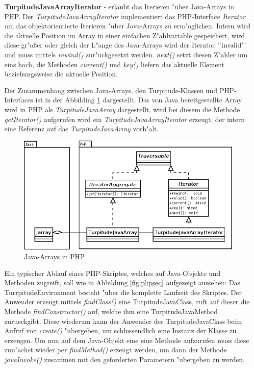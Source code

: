 \textbf{TurpitudeJavaArrayIterator} - erlaubt das Iterieren "uber Java-Arrays in PHP. Der \emph{TurpitudeJavaArrayIterator} implementiert
das PHP-Interface \emph{Iterator} um das objektorientierte Iterieren "uber Java-Arrays zu erm"oglichen. Intern wird die aktuelle
Position im Array in einer einfachen Z"ahlvariable gespeichert, wird diese gr"o\ss er oder gleich der L"ange des Java-Arrays wird der
Iterator "'invalid"' und muss mittels \emph{rewind()} zur"uckgesetzt werden. \emph{next()} setzt diesen Z"ahler um eins hoch, die Methoden
\emph{current()} und \emph{key()} liefern das aktuelle Element beziehungsweise die aktuelle Position.

Der Zusammenhang zwischen Java-Arrays, den Turpitude-Klassen und PHP-Interfaces ist in der Abbilding \ref{fig:javaarrays} dargestellt.
Das von Java bereitgestellte Array wird in PHP als \emph{TurpitudeJavaArray} dargestellt, wird bei diesem die Methode
\emph{getIterator()} aufgerufen wird ein \emph{TurpitudeJavaArrayIterator} erzeugt, der intern eine Referenz auf das \emph{TurpitudeJavaArray}
vorh"alt. 

\begin{figure}[h]
\includegraphics[width=\textwidth]{chap1/img/javaarrays.png}
\caption{Java-Arrays in PHP}
\label{fig:javaarrays}
\end{figure}

Ein typischer Ablauf eines PHP-Skriptes, welches auf Java-Objekte und Methoden zugreift, soll wie in Abbildung \ref{fig:phpseq} aufgezeigt 
aussehen:
Das TurrpitudeEnvironment besteht "uber die komplette Laufzeit des Skriptes. Der Anwender erzeugt mittels \emph{findClass()} eine
TurpitudeJavaClass, ruft auf dieser die Methode \emph{findConstructor()} auf, welche ihm eine TurpitudeJavaMethod zurueckgibt. Diese wiederum 
kann der Anwender der TurpitudeJavaClass beim Aufruf von \emph{create()} "ubergeben, um schlussendlich eine Instanz der Klasse zu erzeugen.
Um nun auf dem Java-Objekt eine eine Methode aufzurufen muss diese zun"achst wieder per \emph{findMethod()} erzeugt werden, um dann der
Methode \emph{javaInvoke()} zusammen mit den geforderten Parametern "ubergeben zu werden.

